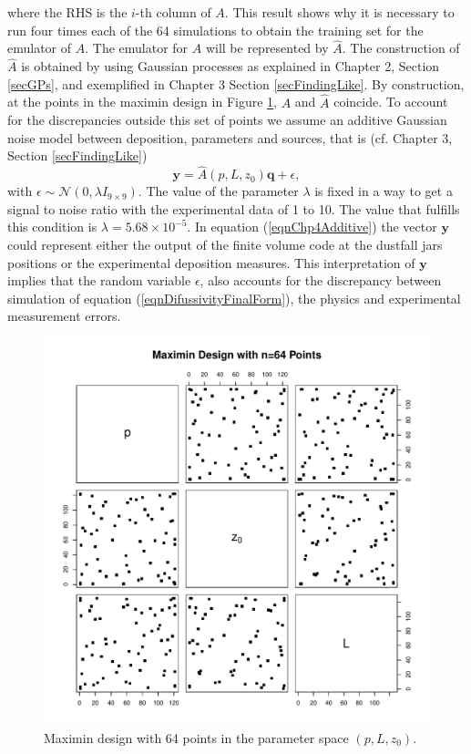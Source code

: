 \documentclass[12pt]{book}
\newcommand{\q}{\textbf{q}}
\newcommand{\y}{\textbf{y}}
\begin{document}
where the RHS is the $i$-th column of $A$. This result shows why
it is necessary to run four times each of the 64 simulations to 
obtain the training set for the emulator of $A$.
The emulator for $A$ will be represented by $\widehat{A}$. The
construction of $\widehat{A}$ is obtained by 
using Gaussian processes as explained in Chapter 2, Section \ref{secGPs}, and
exemplified in Chapter 3 Section \ref{secFindingLike}. By construction,
at the points in the maximin design in Figure \ref{figParticleSwarm}, $A$
and $\widehat{A}$ coincide. To account for the discrepancies outside this
set of points
we assume an additive Gaussian noise model between deposition, parameters
and sources, that is (cf. Chapter 3, Section \ref{secFindingLike})
\begin{equation}\label{eqnChp4Additive}
\y=\widehat{A}(p,L,z_{0})\q+\epsilon,
\end{equation} 
with $\epsilon\sim\mathcal{N}(0,\lambda I_{9\times 9})$. The value of 
the parameter $\lambda$ is fixed in a way to get a signal to noise
ratio with the experimental data of 1 to 10. The value
that fulfills this condition is $\lambda=5.68\times 10^{-5}$. In equation (\ref{eqnChp4Additive})
the vector $\y$ could represent either the output of the finite volume 
code at the dustfall jars positions or the experimental deposition measures. 
This interpretation of $\y$ implies  that the random variable $\epsilon$, also
accounts for the discrepancy between simulation 
of equation (\ref{eqnDifussivityFinalForm}), the physics and 
experimental measurement errors.
\begin{figure}[H]
\centering
\includegraphics[scale=0.6]{./FigChap4/experimentalDesign64}
\caption{Maximin design with 64 points in the parameter space $(p,L,z_{0})$.}
\label{figParticleSwarm}
\end{figure}
\end{document}
